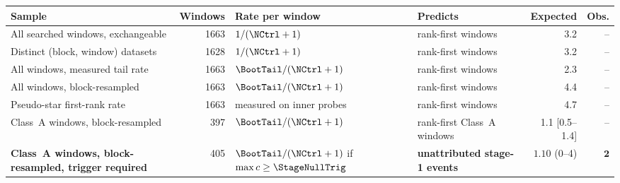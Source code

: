\begin{tabular}{@{}p{}rp{}p{}rr@{}}
\toprule
Sample & Windows & Rate per window & Predicts & Expected & Obs. \\
\midrule
All searched windows, exchangeable & 1663 & $1/(\NCtrl+1)$ & rank-first windows & 3.2 & -- \\
Distinct (block, window) datasets & 1628 & $1/(\NCtrl+1)$ & rank-first windows & 3.2 & -- \\
All windows, measured tail rate & 1663 & $\BootTail/(\NCtrl+1)$ & rank-first windows & 2.3 & -- \\
All windows, block-resampled & 1663 & $\BootTail/(\NCtrl+1)$ & rank-first windows & 4.4 & -- \\
Pseudo-star first-rank rate & 1663 & measured on inner probes & rank-first windows & 4.7 & -- \\
Class~A windows, block-resampled & 397 & $\BootTail/(\NCtrl+1)$ & rank-first Class~A windows & 1.1 [0.5--1.4] & -- \\
\textbf{Class~A windows, block-resampled, trigger required} & 405 & $\BootTail/(\NCtrl+1)$ if $\max c\geq\StageNullTrig$ & \textbf{unattributed stage-1 events} & $\mathbf{1.10}$ (0--4) & $\mathbf{2}$ \\
\bottomrule
\end{tabular}
